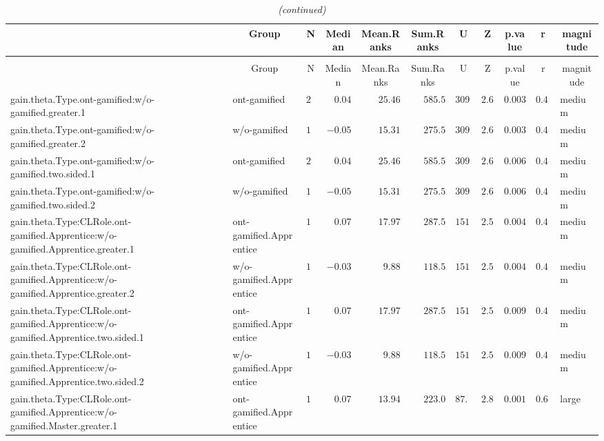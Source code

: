 \documentclass[6pt]{article}
\begin{document}
\setlongtables\begin{landscape}{\scriptsize
\begin{longtable}{llrrrrrrrrl}\caption{Descriptive statistic of the pair wilcoxon analysis } \tabularnewline
\hline\hline
\multicolumn{1}{l}{}&\multicolumn{1}{c}{Group}&\multicolumn{1}{c}{N}&\multicolumn{1}{c}{Median}&\multicolumn{1}{c}{Mean.Ranks}&\multicolumn{1}{c}{Sum.Ranks}&\multicolumn{1}{c}{U}&\multicolumn{1}{c}{Z}&\multicolumn{1}{c}{p.value}&\multicolumn{1}{c}{r}&\multicolumn{1}{c}{magnitude}\tabularnewline
\hline
\endfirsthead\caption[]{\em (continued)} \tabularnewline
\hline
\multicolumn{1}{l}{}&\multicolumn{1}{c}{Group}&\multicolumn{1}{c}{N}&\multicolumn{1}{c}{Median}&\multicolumn{1}{c}{Mean.Ranks}&\multicolumn{1}{c}{Sum.Ranks}&\multicolumn{1}{c}{U}&\multicolumn{1}{c}{Z}&\multicolumn{1}{c}{p.value}&\multicolumn{1}{c}{r}&\multicolumn{1}{c}{magnitude}\tabularnewline
\hline
\endhead
\hline
\endfoot
\label{result}
gain.theta.Type.ont-gamified:w/o-gamified.greater.1&ont-gamified&$23$&$ 0.04$&$25.46$&$585.5$&$309.5$&$2.69$&$0.003$&$0.421$&medium\tabularnewline
gain.theta.Type.ont-gamified:w/o-gamified.greater.2&w/o-gamified&$18$&$-0.05$&$15.31$&$275.5$&$309.5$&$2.69$&$0.003$&$0.421$&medium\tabularnewline
gain.theta.Type.ont-gamified:w/o-gamified.two.sided.1&ont-gamified&$23$&$ 0.04$&$25.46$&$585.5$&$309.5$&$2.69$&$0.006$&$0.421$&medium\tabularnewline
gain.theta.Type.ont-gamified:w/o-gamified.two.sided.2&w/o-gamified&$18$&$-0.05$&$15.31$&$275.5$&$309.5$&$2.69$&$0.006$&$0.421$&medium\tabularnewline
gain.theta.Type:CLRole.ont-gamified.Apprentice:w/o-gamified.Apprentice.greater.1&ont-gamified.Apprentice&$16$&$ 0.07$&$17.97$&$287.5$&$151.5$&$2.58$&$0.004$&$0.487$&medium\tabularnewline
gain.theta.Type:CLRole.ont-gamified.Apprentice:w/o-gamified.Apprentice.greater.2&w/o-gamified.Apprentice&$12$&$-0.03$&$ 9.88$&$118.5$&$151.5$&$2.58$&$0.004$&$0.487$&medium\tabularnewline
gain.theta.Type:CLRole.ont-gamified.Apprentice:w/o-gamified.Apprentice.two.sided.1&ont-gamified.Apprentice&$16$&$ 0.07$&$17.97$&$287.5$&$151.5$&$2.58$&$0.009$&$0.487$&medium\tabularnewline
gain.theta.Type:CLRole.ont-gamified.Apprentice:w/o-gamified.Apprentice.two.sided.2&w/o-gamified.Apprentice&$12$&$-0.03$&$ 9.88$&$118.5$&$151.5$&$2.58$&$0.009$&$0.487$&medium\tabularnewline
gain.theta.Type:CLRole.ont-gamified.Apprentice:w/o-gamified.Master.greater.1&ont-gamified.Apprentice&$16$&$ 0.07$&$13.94$&$223.0$&$ 87.0$&$2.88$&$0.001$&$0.613$&large\tabularnewline

\end{longtable}}
\end{landscape}
\end{document}
